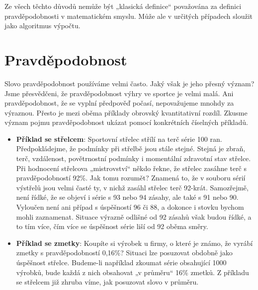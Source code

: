     Ze všech těchto důvodů nemůže být „klasická definice“ považována za definici pravděpodobnosti v
    matematickém smyslu. Může ale v určitých případech sloužit jako algoritmus výpočtu.

  \section{Pravděpodobnost}\label{mai:IchapIVsecII}
    Slovo pravděpodobnost používáme velmi často. Jaký však je jeho přesný význam? Jsme přesvědčeni, 
    že pravděpodobnost výhry ve sportce je velmi malá. Ani pravděpodobnost, že se vyplní předpověď 
    počasí, nepovažujeme mnohdy za výraznou. Přesto je mezi oběma příklady obrovský kvantitativní 
    rozdíl. Zkusme význam pojmu pravděpodobnost ukázat pomocí konkrétních číselných příkladů.
  
    \begin{itemize}[noitemsep]
      \item \textbf{Příklad se střelcem}: Sportovní střelec střílí na terč série \num{100} ran. 
            Předpokládejme, že podmínky při střelbě jsou stále stejné. Stejná je zbraň, terč, 
            vzdálenost, povětrnostní podmínky i momentální zdravotní stav střelce. Při hodnocení 
            střelcova „mistrovství“ někdo řekne, že střelec zasáhne terč s pravděpodobností 
            \num{92}\%. Jak tomu rozumět? Znamená to, že v souboru sérií výstřelů jsou velmi časté 
            ty, v nichž zasáhl střelec terč \num{92}-krát. Samozřejmě, není řídké, že se objeví i 
            série s \num{93} nebo \num{94} zásahy, ale také s \num{91} nebo \num{90}. Vyloučen není 
            ani případ s úspěšností \num{96} či \num{88}, a dokonce i stovku bychom mohli 
            zaznamenat. Situace výrazně odlišné od \num{92} zásahů však budou řídké, a to tím více, 
            čím více se úspěšnost série liší od \num{92} oběma směry.
      \item \textbf{Příklad se zmetky}: Koupíte si výrobek u firmy, o které je známo, že vyrábí 
            zmetky s pravděpodobností 0,16\%? Situaci lze posuzovat obdobně jako úspěšnost střelce. 
            Budeme-li například zkoumat série obsahující 1000 výrobků, bude každá z nich obsahovat 
            „v průměru“ 16\% zmetků. Z příkladu se střelcem již zhruba víme, jak posuzovat slovo v 
            průměru.
    \end{itemize}
    
